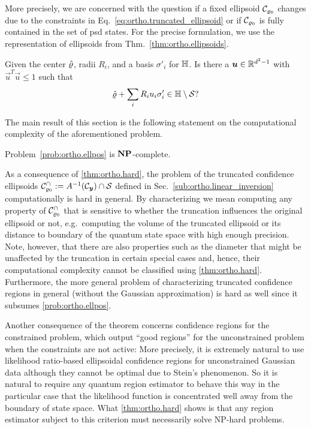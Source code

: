 More precisely, we are concerned with the question if a fixed ellipsoid $\mathcal{C}_{\varrho_0}$ changes due to the constraints in Eq.~\eqref{eq:ortho.truncated_ellipsoid} or if $\mathcal{C}_{\varrho_0}$ is fully contained in the set of psd states.
For the precise formulation, we use the representation of ellipsoids from Thm.~\ref{thm:ortho.ellipsoids}.
\begin{problem}\label{prob:ortho.ellpos}
  Given the center $\hat{\varrho}$, radii $R_i$, and a basis $\sigma'_i$ for $\mathbb{H}$.
  Is there a ${\boldsymbol{u}} \in \mathbb{R}^{d^2 - 1}$ with $\vec{u}^{T}\vec{u} \leq 1$ such that
  \[
    \label{eq:ortho.ellpos_condition}
    \hat{\varrho} + \sum_{i}R_{i}u_{i}\sigma_{i}' \in \mathbb{H} \setminus \mathcal{S}?
  \]
\end{problem}
The main result of this section is the following statement on the computational complexity of the aforementioned problem.
\begin{theorem}\label{thm:ortho.hard}
  Problem~\ref{prob:ortho.ellpos} is $\mathbf{NP}$-complete.
\end{theorem}
As a consequence of \cref{thm:ortho.hard}, the problem of  the truncated confidence ellipsoids $\mathcal{C}_{\varrho_0}^\cap := A^{-1}(\mathcal{C}_{\boldsymbol{y}}) \cap \mathcal{S}$ defined in Sec.~\ref{sub:ortho.linear_inversion} computationally is hard in general.
By characterizing we mean computing any property of $\mathcal{C}_{\varrho_0}^\cap$ that is sensitive to whether the truncation influences the original ellipsoid or not, e.g.\ computing the volume of the truncated ellipsoid or its distance to boundary of the quantum state space with high enough precision.
Note, however, that there are also properties such as the diameter that might be unaffected by the truncation in certain special cases and, hence, their computational complexity cannot be classified using \cref{thm:ortho.hard}.
Furthermore, the more general problem of characterizing truncated confidence regions in general (without the Gaussian approximation) is hard as well since it subsumes \cref{prob:ortho.ellpos}.

Another consequence of the theorem concerns confidence regions for the constrained problem, which output ``good regions'' for the unconstrained problem when the constraints are not active:
More precisely, it is extremely natural to use likelihood ratio-based ellipsoidal confidence regions for unconstrained Gaussian data although they cannot be optimal due to Stein's phenomenon.
So it is natural to require any quantum region estimator to behave this way in the particular case that the likelihood function is concentrated well away from the boundary of state space.
What \cref{thm:ortho.hard} shows is that any region estimator subject to this criterion must necessarily solve NP-hard problems.\\


